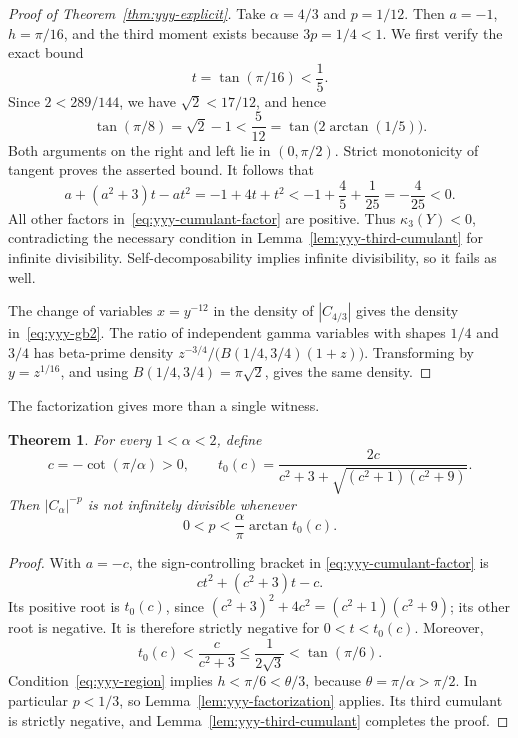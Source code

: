 \documentclass[11pt,a4paper]{article}
\newtheorem{theorem}{Theorem}[section]
\theoremstyle{definition}
\theoremstyle{remark}
\numberwithin{equation}{section}
\begin{document}
\begin{proof}[Proof of Theorem~\ref{thm:yyy-explicit}]
Take $\alpha=4/3$ and $p=1/12$. Then
$a=-1$, $h=\pi/16$, and the third moment exists because $3p=1/4<1$.
We first verify the exact bound
\[
 t=\tan(\pi/16)<\frac15.
\]
Since $2<289/144$, we have $\sqrt2<17/12$, and hence
\[
 \tan(\pi/8)=\sqrt2-1<\frac5{12}
       =\tan\bigl(2\arctan(1/5)\bigr).
\]
Both arguments on the right and left lie in $(0,\pi/2)$.
Strict monotonicity of tangent proves the asserted bound. It follows that
\[
 a+(a^2+3)t-at^2=-1+4t+t^2
 <-1+\frac45+\frac1{25}=-\frac4{25}<0.
\]
All other factors in~\eqref{eq:yyy-cumulant-factor} are positive.
Thus $\kappa_3(Y)<0$, contradicting the necessary condition in
Lemma~\ref{lem:yyy-third-cumulant} for infinite divisibility.
Self-decomposability implies infinite divisibility, so it fails as well.

The change of variables $x=y^{-12}$ in the density of $|C_{4/3}|$
gives the density in~\eqref{eq:yyy-gb2}. The ratio of independent gamma
variables with shapes $1/4$ and $3/4$ has beta-prime density
$z^{-3/4}/\bigl(B(1/4,3/4)(1+z)\bigr)$. Transforming by $y=z^{1/16}$,
and using $B(1/4,3/4)=\pi\sqrt2$, gives the same density.
\end{proof}

The factorization gives more than a single witness.

\begin{theorem}
\label{thm:yyy-region}
For every $1<\alpha<2$, define
\[
 c=-\cot(\pi/\alpha)>0,\qquad
 t_0(c)=\frac{2c}
 {c^2+3+\sqrt{(c^2+1)(c^2+9)}}.
\]
Then $|C_\alpha|^{-p}$ is not infinitely divisible whenever
\begin{equation}
 0<p<\frac{\alpha}{\pi}\arctan t_0(c).
 \label{eq:yyy-region}
\end{equation}
\end{theorem}

\begin{proof}
With $a=-c$, the sign-controlling bracket in
\eqref{eq:yyy-cumulant-factor} is
\[
 ct^2+(c^2+3)t-c.
\]
Its positive root is $t_0(c)$, since
$(c^2+3)^2+4c^2=(c^2+1)(c^2+9)$; its other root is negative.
It is therefore strictly negative for $0<t<t_0(c)$.
Moreover,
\[
 t_0(c)<\frac{c}{c^2+3}
 \le\frac1{2\sqrt3}<\tan(\pi/6).
\]
Condition~\eqref{eq:yyy-region} implies
$h<\pi/6<\theta/3$, because $\theta=\pi/\alpha>\pi/2$.
In particular $p<1/3$, so Lemma~\ref{lem:yyy-factorization} applies.
Its third cumulant is strictly negative, and
Lemma~\ref{lem:yyy-third-cumulant} completes the proof.
\end{proof}
\end{document}
